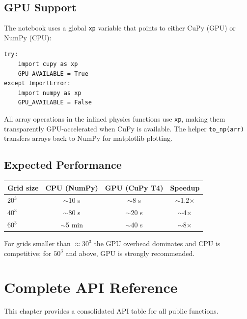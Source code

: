 \documentclass[11pt, a4paper, twoside]{report}
\begin{document}
\section{GPU Support}

The notebook uses a global \texttt{xp} variable that points to either
CuPy (GPU) or NumPy (CPU):

\begin{lstlisting}[caption={GPU/CPU selection in notebook}]
try:
    import cupy as xp
    GPU_AVAILABLE = True
except ImportError:
    import numpy as xp
    GPU_AVAILABLE = False
\end{lstlisting}

All array operations in the inlined physics functions use \texttt{xp},
making them transparently GPU-accelerated when CuPy is available.  The
helper \texttt{to\_np(arr)} transfers arrays back to NumPy for
matplotlib plotting.

\section{Expected Performance}

\begin{center}
\begin{tabular}{lccc}
  \toprule
  Grid size & CPU (NumPy) & GPU (CuPy T4) & Speedup \\
  \midrule
  $20^3$  & $\sim$10 s  & $\sim$8 s  & $\sim$1.2$\times$ \\
  $40^3$  & $\sim$80 s  & $\sim$20 s & $\sim$4$\times$ \\
  $60^3$  & $\sim$5 min & $\sim$40 s & $\sim$8$\times$ \\
  \bottomrule
\end{tabular}
\end{center}

For grids smaller than $\approx 30^3$ the GPU overhead dominates and
CPU is competitive; for $50^3$ and above, GPU is strongly recommended.

\chapter{Complete API Reference}
\label{chap:api}

This chapter provides a consolidated API table for all public functions.
\end{document}
